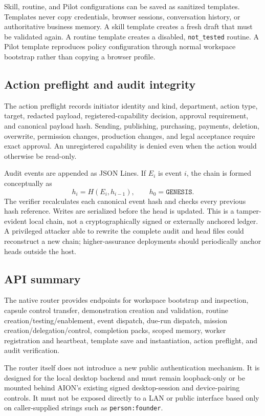 Skill, routine, and Pilot configurations can be saved as sanitized templates.
Templates never copy credentials, browser sessions, conversation history, or
authoritative business memory.  A skill template creates a fresh draft that
must be validated again.  A routine template creates a disabled,
\texttt{not\_tested} routine.  A Pilot template reproduces policy configuration
through normal workspace bootstrap rather than copying a browser profile.

\subsection{Action preflight and audit integrity}

The action preflight records initiator identity and kind, department, action
type, target, redacted payload, registered-capability decision, approval
requirement, and canonical payload hash.  Sending, publishing, purchasing,
payments, deletion, overwrite, permission changes, production changes, and
legal acceptance require exact approval.  An unregistered capability is
denied even when the action would otherwise be read-only.

Audit events are appended as JSON Lines.  If $E_i$ is event $i$, the chain is
formed conceptually as
\[
 h_i = H(E_i, h_{i-1}), \qquad h_0 = \texttt{GENESIS}.
\]
The verifier recalculates each canonical event hash and checks every previous
hash reference.  Writes are serialized before the head is updated.  This is a
tamper-evident local chain, not a cryptographically signed or externally
anchored ledger.  A privileged attacker able to rewrite the complete audit and
head files could reconstruct a new chain; higher-assurance deployments should
periodically anchor heads outside the host.

\subsection{API summary}

The native router provides endpoints for workspace bootstrap and inspection,
capsule control transfer, demonstration creation and validation, routine
creation/testing/enablement, event dispatch, due-run dispatch, mission
creation/delegation/control, completion packs, scoped memory, worker
registration and heartbeat, template save and instantiation, action preflight,
and audit verification.

The router itself does not introduce a new public authentication mechanism.
It is designed for the local desktop backend and must remain loopback-only or
be mounted behind AION's existing signed desktop-session and device-pairing
controls.  It must not be exposed directly to a LAN or public interface based
only on caller-supplied strings such as \texttt{person:founder}.

